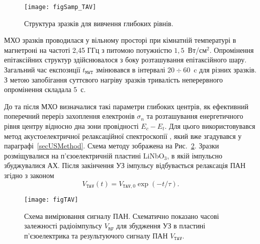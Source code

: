 \begin{figure}
\center
\texttt{[image: figSamp\_TAV]}
\caption{\label{figSamp_TAV}
Структура зразків для вивчення глибоких рівнів.
}%
\end{figure}

МХО зразків проводилася у вільному просторі при кімнатній температурі в магнетроні на частоті 2,45 ГГц з питомою потужністю  $1,5$~Вт/см$^2$.
Опромінення епітаксійних структур здійснювалося з боку розташування епітаксійного шару.
Загальний час експозиції $t_\mathtt{MWT}$ змінювався в інтервалі $20\div60$~c для різних зразків.
З метою запобігання суттєвого нагріву зразків тривалість неперервного опромінення складала 5~с.

До та після МХО визначалися такі параметри глибоких центрів, як ефективний поперечний переріз захоплення електронів $\sigma_n$
та розташування енергетичного рівня центру відносно дна зони провідності $E_c-E_t$.
Для цього використовувався метод акустоелектричної релаксаційної спектроскопії \cite{Saiko1993,OstrovPAN,OlikhSSC},
який вже згадувався у параграфі~\ref{secUSMethod}.
Схема методу зображена на Рис.~\ref{figTAV}.
Зразки розміщувалися на п'єзоелектричній пластині LiNbO$_3$, в якій імпульсно збуджувалися АХ.
Після закінчення УЗ імпульсу відбувається релаксація ПАН згідно з законом
\begin{equation}\label{eqVtav}
  V_\mathtt{TAV}(t)=V_{\mathtt{TAV},0}\exp(-t/\tau).
\end{equation}

\begin{figure}
\center
\texttt{[image: figTAV]}
\caption{\label{figTAV}
Схема вимірювання сигналу ПАН.
Схематично показано часові залежності радіоімпульсу $V_\mathtt{RF}$ для збудження УЗ в пластині п'єзоелектрика
та результуючого сигналу ПАН $V_\mathtt{TAV}$.
}%
\end{figure}

